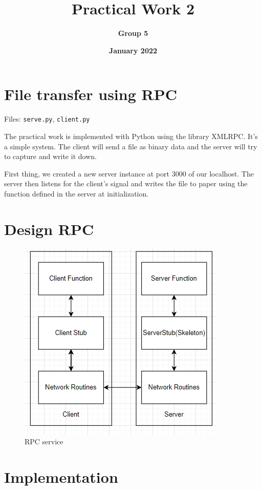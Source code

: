 \documentclass[12pt]{article}
\title{\textbf{Practical Work 2}}
\author{\textbf{Group 5}}
\date{\textbf{January 2022}}
\begin{document}
\maketitle

\section{File transfer using RPC}
\hspace{0.5cm}
\vspace{0.5cm}
 Files: \texttt{serve.py}, \texttt{client.py}
 
 The practical work is implemented with Python using the library XMLRPC. It's a simple system. The client will send a file as binary data and the server will try to capture and write it down.
\vspace{0.5cm}

 First thing, we created a new server instance at port 3000 of our localhost. The server then listens for the client's signal and writes the file to paper using the function defined in the server at initialization.

\section{Design RPC}
\begin{figure}[h]
    \centering
    \includegraphics{image/How.png}
    \caption{RPC service}
    \label{fig:my_label}
\end{figure}
\newpage
\section{Implementation}
\end{document}
